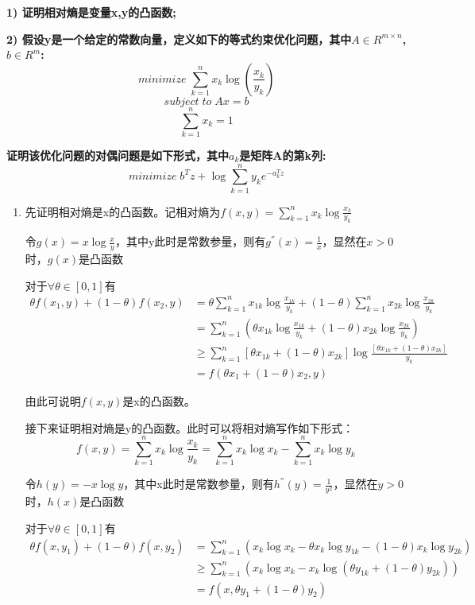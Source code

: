 \documentclass[]{article}
\begin{document}
\textbf{1) 证明相对熵是变量x,y的凸函数;}

\textbf{2) 假设y是一个给定的常数向量，定义如下的等式约束优化问题，其中$A\in R^{m\times n}$, $b\in R^m$:}
$$
minimize\;\sum_{k=1}^n x_k \log (\frac{x_k}{y_k})
$$
$$
subject\;to\;Ax=b
$$
$$
\sum_{k=1}^n x_k=1
$$

\textbf{证明该优化问题的对偶问题是如下形式，其中$a_k$是矩阵A的第k列:}
$$
minimize\;b^T z+\log \sum_{k=1}^n y_k e^{-a_k^T z}
$$

\begin{enumerate}
    \item 
    
    先证明相对熵是x的凸函数。记相对熵为$f(x,y)=\sum_{k=1}^n x_k \log\frac{x_k}{y_k}$
    
    令$g(x)=x\log\frac{x}{y}$，其中y此时是常数参量，则有$g^{''} (x)=\frac{1}{x}$，显然在$x>0$时，$g(x)$是凸函数
    
    对于$\forall \theta \in[0,1]$有
    \begin{align*}
    \theta f(x_1,y)+(1-\theta)f(x_2,y) &= \theta \sum_{k=1}^n x_{1k} \log\frac{x_{1k}}{y_k}+(1-\theta)\sum_{k=1}^n x_{2k} \log\frac{x_{2k}}{y_k}\\
    &= \sum_{k=1}^n(\theta x_{1k} \log\frac{x_{1k}}{y_k}+(1-\theta) x_{2k} \log\frac{x_{2k}}{y_k})\\
    &\geq \sum_{k=1}^n [\theta x_{1k}+(1-\theta) x_{2k}] \log\frac{[\theta x_{1k}+(1-\theta) x_{2k}]}{y_k}\\
    &= f(\theta x_1 + (1-\theta)x_2, y)
    \end{align*}

    由此可说明$f(x,y)$是x的凸函数。
    
    接下来证明相对熵是y的凸函数。此时可以将相对熵写作如下形式：
    $$
    f(x,y)=\sum_{k=1}^n x_k \log\frac{x_k}{y_k}=\sum_{k=1}^n x_k \log x_k-\sum_{k=1}^n x_k \log y_k
    $$
    
    令$h(y)=-x\log y$，其中x此时是常数参量，则有$h^{''} (y)=\frac{1}{y^2}$，显然在$y>0$时，$h(x)$是凸函数
    
    对于$\forall \theta \in[0,1]$有
    \begin{align*}
    \theta f(x,y_1)+(1-\theta)f(x,y_2) &= \sum_{k=1}^n (x_k \log x_k-\theta x_k \log y_{1k}-(1-\theta) x_k \log y_{2k})\\
    &\geq \sum_{k=1}^n (x_k \log x_k -x_k \log (\theta y_{1k}+(1-\theta)y_{2k}))\\
    &= f(x,\theta y_1 + (1-\theta)y_2)
    \end{align*}
    

\end{enumerate}
\end{document}
